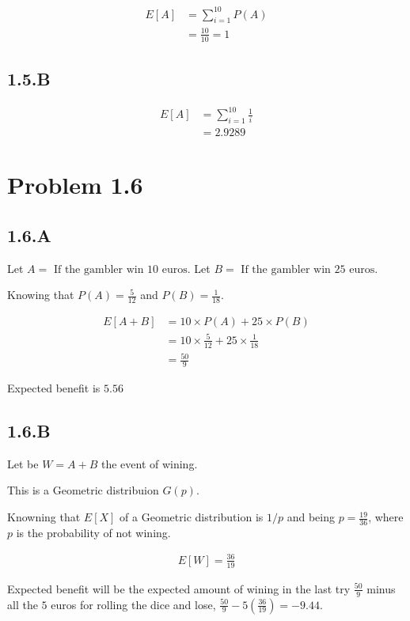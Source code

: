 \documentclass[12pt, a4paper]{article}
\begin{document}
\begin{subequations}
  \begin{align}
    E[A] &= \sum_{i=1}^{10} P(A)\\
         &= \frac{10}{10} = 1
  \end{align}
\end{subequations}

\subsection{1.5.B}
\begin{subequations}
  \begin{align}
    E[A] &= \sum_{i=1}^{10} \frac{1}{i}\\
         &= 2.9289
  \end{align}
\end{subequations}

\section{Problem 1.6}
\subsection{1.6.A}
Let $A = \text{ If the gambler win 10 euros}$.\newline
Let $B = \text{ If the gambler win 25 euros}$.

Knowing that $P(A) = \frac{5}{12}$ and $P(B) = \frac{1}{18}$.

\begin{subequations}
  \begin{align}
    E[A+B] &= 10 \times P(A) + 25 \times P(B)\\
           &= 10 \times \frac{5}{12} + 25 \times \frac{1}{18}\\
           &= \frac{50}{9}
  \end{align}
\end{subequations}

Expected benefit is $5.56$

\subsection{1.6.B}
Let be $W = A+B$ the event of wining.

This is a Geometric distribuion $G(p)$.

Knowning that $E[X]$ of a Geometric distribution is $1/p$ and being $p = \frac{19}{36}$, where $p$ is the probability of not wining.

\begin{subequations}
  \begin{align}
    E[W] = \frac{36}{19}
  \end{align}
\end{subequations}

Expected benefit will be the expected amount of wining in the last try $\frac{50}{9}$ minus all the $5$ euros for rolling the dice and lose, $\frac{50}{9} - 5(\frac{36}{19}) = -9.44$.
\end{document}
